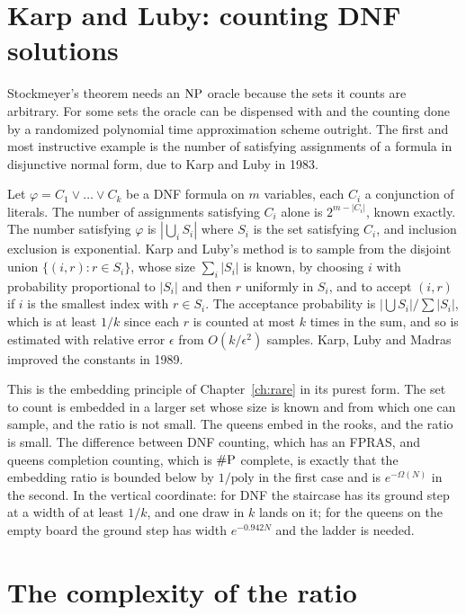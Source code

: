 \section{Karp and Luby: counting DNF solutions}

Stockmeyer's theorem needs an $\mathrm{NP}$ oracle because the sets it counts are arbitrary. For some sets the oracle can be dispensed with and the counting done by a randomized polynomial time approximation scheme outright. The first and most instructive example is the number of satisfying assignments of a formula in disjunctive normal form, due to Karp and Luby in 1983.

Let $\varphi = C_1 \vee \dots \vee C_k$ be a DNF formula on $m$ variables, each $C_i$ a conjunction of literals. The number of assignments satisfying $C_i$ alone is $2^{m - |C_i|}$, known exactly. The number satisfying $\varphi$ is $|\bigcup_i S_i|$ where $S_i$ is the set satisfying $C_i$, and inclusion exclusion is exponential. Karp and Luby's method is to sample from the disjoint union $\{ (i, r) : r \in S_i \}$, whose size $\sum_i |S_i|$ is known, by choosing $i$ with probability proportional to $|S_i|$ and then $r$ uniformly in $S_i$, and to accept $(i, r)$ if $i$ is the smallest index with $r \in S_i$. The acceptance probability is $|\bigcup S_i| / \sum |S_i|$, which is at least $1/k$ since each $r$ is counted at most $k$ times in the sum, and so is estimated with relative error $\epsilon$ from $O(k / \epsilon^2)$ samples. Karp, Luby and Madras improved the constants in 1989.

This is the embedding principle of Chapter~\ref{ch:rare} in its purest form. The set to count is embedded in a larger set whose size is known and from which one can sample, and the ratio is not small. The queens embed in the rooks, and the ratio is small. The difference between DNF counting, which has an FPRAS, and queens completion counting, which is $\#\mathrm{P}$ complete, is exactly that the embedding ratio is bounded below by $1/\mathrm{poly}$ in the first case and is $e^{-\Omega(N)}$ in the second. In the vertical coordinate: for DNF the staircase has its ground step at a width of at least $1/k$, and one draw in $k$ lands on it; for the queens on the empty board the ground step has width $e^{-0.942 N}$ and the ladder is needed.

\section{The complexity of the ratio}

